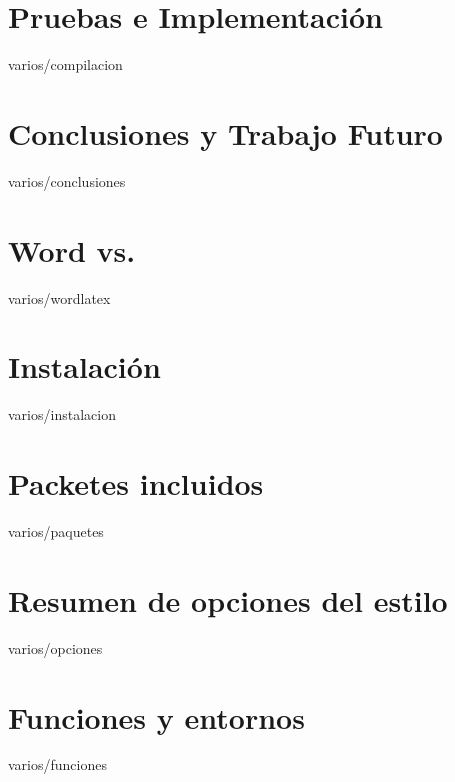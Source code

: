 \documentclass[epsbased,copyright,final,printable,covers,extendedindex,firstnumbered,tfg,gnuplot]{tfgtfmthesisuam}
\begin{document}
\chapter{Pruebas e Implementación\label{CAP:COMPILACION}}{varios/compilacion}

\chapter{Conclusiones y Trabajo Futuro\label{CAP:CONCLUSIONES}}{varios/conclusiones}

\appendix

\chapter{Word\textsuperscript{\textregistered} vs. \LaTeXe\label{CAP:WORDLATEX}}{varios/wordlatex}
\chapter{Instalación\label{CAP:INSTALACION}}{varios/instalacion}
\chapter{Packetes incluidos\label{CAP:PAQUETES}}{varios/paquetes}
\chapter{Resumen de opciones del estilo\label{CAP:OPCIONES}}{varios/opciones}
\chapter{Funciones y entornos\label{CAP:FUNCENT}}{varios/funciones}
\end{document}
